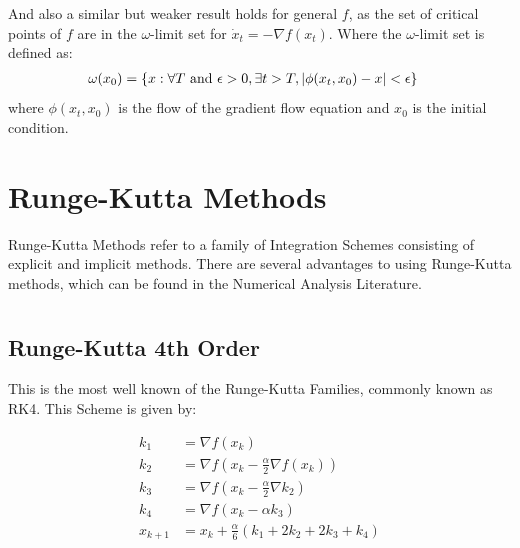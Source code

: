 \documentclass[a0,portrait]{a0poster}
\begin{document}
\begin{multicols}{3}
And also a similar but weaker result holds for general $f$, as the set of critical points of $f$ are in the $\omega$-limit set for $\dot{x}_t = -\nabla f(x_t)$. Where the $\omega$-limit set is defined as:
\begin{align*}\vspace{1cm}
\omega(x_0) = \{x: \forall T &\text{ and } \epsilon > 0, \exists t>T, |\phi (x_t, x_0) - x|<\epsilon \}
\end{align*}\vspace{1cm}
where $\phi(x_t,x_0)$ is the flow of the gradient flow equation and $x_0$ is the initial condition.

\color{Black} %

\section*{Runge-Kutta Methods}
Runge-Kutta Methods refer to a family of Integration Schemes consisting of explicit and implicit methods. There are several advantages to using Runge-Kutta methods, which can be
found in the Numerical Analysis Literature.
\section*{}
\subsection*{Runge-Kutta 4th Order }
This is the most well known of the Runge-Kutta Families, commonly known as RK4. This Scheme is given by:

\begin{align*}
k_1 &= \nabla f(x_k) \\
k_2 &= \nabla f(x_k - \frac{\alpha}{2} \nabla f(x_k)) \\
k_3 &= \nabla f(x_k - \frac{\alpha}{2}\nabla k_2) \\
k_4 &= \nabla f(x_k - \alpha k_3)      \\
x_{k+1} &= x_k + \frac{\alpha}{6}(k_1 + 2k_2 + 2k_3 + k_4)
\end{align*}


\end{multicols}
\end{document}
